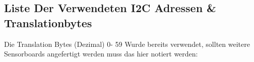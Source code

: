 \subsection{Liste Der Verwendeten I2C Adressen \& Translationbytes}
\label{liste_Translationbytes}
Die Translation Bytes (Dezimal) 0- 59 Wurde bereits verwendet, sollten weitere Sensorboards angefertigt werden muss das hier notiert werden:







